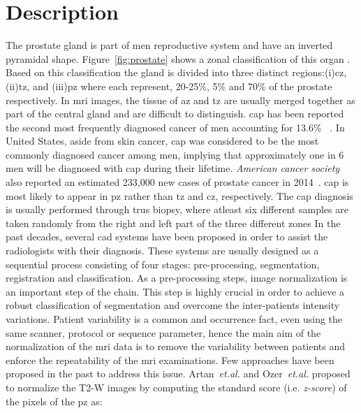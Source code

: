 \graphicspath{ {./content/intro/figures/} }

\section{Description}
\label{sec:descr}  %
The prostate gland is part of men reproductive system and have an inverted pyramidal shape. 
Figure~\ref{fig:prostate} shows a zonal classification of this organ \cite{mcneal1981zonal}. 
Based on this classification the gland is divided into three distinct regions:(i)\ac{cz}, (ii)\ac{tz}, and (iii)\ac{pz} where each represent, 20-25\%, 5\% and 70\% of the prostate respectively. 
In \ac{mri} images, the tissue of \ac{az} and \ac{tz} are usually merged together as part of the central gland and are difficult to distinguish. 
\ac{cap} has been reported the second most frequently diagnosed cancer of men accounting for 13.6\% ~\cite{ferlay2010estimates}. 
In United States, aside from skin cancer, \ac{cap} was considered to be the most commonly diagnosed cancer among men, implying that approximately one in 6 men will be diagnosed with \ac{cap} during their lifetime. 
\textit{American cancer society} also reported an estimated 233,000 new cases of prostate cancer in 2014~\cite{CancerFactsFigures2014}. 
\Ac{cap} is most likely to appear in \ac{pz} rather than \ac{tz} and \ac{cz}, respectively. 
The \ac{cap} diagnosis is usually performed through \ac{trus} biopsy, where atleast six different samples are taken randomly from the right and left part of the three different zones  
In the past decades, several \ac{cad} systems have been proposed in order to assist the radiologists with their diagnosis. These systems are usually designed as a sequential process consisting of four stages: pre-processing, segmentation, registration and classification.
As a pre-processing steps, image normalization is an important step of the chain. 
This step is highly crucial in order to achieve a robust classification of segmentation and overcome the inter-patients intensity variations.
Patient variability is a common and occurrence fact, even using the same scanner, protocol or sequence parameter, hence the main aim of the normalization of the \ac{mri} data is to remove the variability between patients and enforce the repeatability of the \ac{mri} examinations. 
Few approaches have been proposed in the past to address this issue. 
Artan~\textit{et.al.}\cite{artan2010prostate,artan2009prostate} and Ozer~\textit{et.al.} proposed to normalize the T2-W images by computing the standard score (i.e. \textit{z-score}) of the pixels of the \ac{pz} as: 
